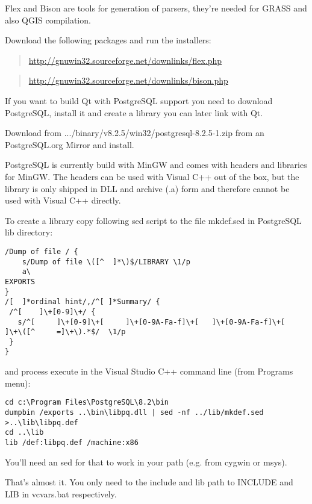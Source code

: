 \hypertarget{toc80}{}
Flex and Bison are tools for generation of parsers, they're needed for GRASS and also QGIS compilation.

Download the following packages and run the installers:

	\begin{quotation}
\url{http://gnuwin32.sourceforge.net/downlinks/flex.php}
	\end{quotation}

	\begin{quotation}
\url{http://gnuwin32.sourceforge.net/downlinks/bison.php}
	\end{quotation}

\hypertarget{toc81}{}
If you want to build Qt with PostgreSQL support you need to download
PostgreSQL, install it and create a library you can later link with Qt.

Download from .../binary/v8.2.5/win32/postgresql-8.2.5-1.zip from an
PostgreSQL.org Mirror and install.

PostgreSQL is currently build with MinGW and comes with headers and libraries
for MinGW.  The headers can be used with Visual C++ out of the box, but the library
is only shipped in DLL and archive (.a) form and therefore cannot be used with
Visual C++ directly.

To create a library copy following sed script to the file mkdef.sed in
PostgreSQL lib directory:

\begin{verbatim}
/Dump of file / {
	s/Dump of file \([^	 ]*\)$/LIBRARY \1/p
	a\
EXPORTS
}
/[ 	]*ordinal hint/,/^[	]*Summary/ {
 /^[ 	]\+[0-9]\+/ {
   s/^[ 	]\+[0-9]\+[ 	]\+[0-9A-Fa-f]\+[ 	]\+[0-9A-Fa-f]\+[ 	]\+\([^ 	=]\+\).*$/	\1/p
 }
}
\end{verbatim}

and process execute in the Visual Studio C++ command line (from Programs menu):

\begin{verbatim}
cd c:\Program Files\PostgreSQL\8.2\bin
dumpbin /exports ..\bin\libpq.dll | sed -nf ../lib/mkdef.sed >..\lib\libpq.def
cd ..\lib
lib /def:libpq.def /machine:x86
\end{verbatim}

You'll need an sed for that to work in your path (e.g. from cygwin or msys).

That's almost it.  You only need to the include and lib path to INCLUDE and LIB
in vcvars.bat respectively.

